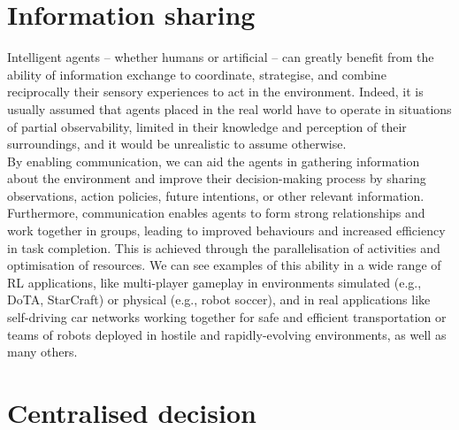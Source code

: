 \documentclass[a4paper,singleside,12pt]{report} %
\begin{document}
\section{Information sharing}\label{information-sharing}

Intelligent agents -- whether humans or artificial -- can greatly benefit from the ability of information exchange to coordinate, strategise, and combine reciprocally their sensory experiences to act in the environment. Indeed, it is usually assumed that agents placed in the real world have to operate in situations of partial observability, limited in their knowledge and perception of their surroundings, and it would be unrealistic to assume otherwise.\\
By enabling communication, we can aid the agents in gathering information about the environment and improve their decision-making process by sharing observations, action policies, future intentions, or other relevant information. Furthermore, communication enables agents to form strong relationships and work together in groups, leading to improved behaviours and increased efficiency in task completion. This is achieved through the parallelisation of activities and optimisation of resources. We can see examples of this ability in a wide range of RL applications, like multi-player gameplay in environments simulated (e.g., DoTA, StarCraft) or physical (e.g., robot soccer), and in real applications like self-driving car networks working together for safe and efficient transportation or teams of robots deployed in hostile and rapidly-evolving environments, as well as many others.

\section{Centralised decision}\label{centralised-decision}
\end{document}
